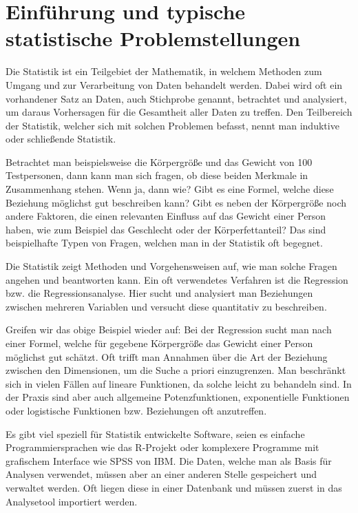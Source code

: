 \chapter{Einführung und typische statistische Problemstellungen}
\label{chapter:1}

Die Statistik ist ein Teilgebiet der Mathematik, in welchem Methoden zum Umgang und zur Verarbeitung von Daten behandelt werden. Dabei wird oft ein vorhandener Satz an Daten, auch Stichprobe genannt, betrachtet und analysiert, um daraus Vorhersagen für die Gesamtheit aller Daten zu treffen. Den Teilbereich der Statistik, welcher sich mit solchen Problemen befasst, nennt man induktive oder schließende Statistik.

Betrachtet man beispielsweise die Körpergröße und das Gewicht von 100 Testpersonen, dann kann man sich fragen, ob diese beiden Merkmale in Zusammenhang stehen. Wenn ja, dann wie? Gibt es eine Formel, welche diese Beziehung möglichst gut beschreiben kann? Gibt es neben der Körpergröße noch andere Faktoren, die einen relevanten Einfluss auf das Gewicht einer Person haben, wie zum Beispiel das Geschlecht oder der Körperfettanteil? Das sind beispielhafte Typen von Fragen, welchen man in der Statistik oft begegnet.

Die Statistik zeigt Methoden und Vorgehensweisen auf, wie man solche Fragen angehen und beantworten kann. Ein oft verwendetes Verfahren ist die Regression bzw. die Regressionsanalyse. Hier sucht und analysiert man Beziehungen zwischen mehreren Variablen und versucht diese quantitativ zu beschreiben.

Greifen wir das obige Beispiel wieder auf: Bei der Regression sucht man nach einer Formel, welche für gegebene Körpergröße das Gewicht einer Person möglichst gut schätzt. Oft trifft man Annahmen über die Art der Beziehung zwischen den Dimensionen, um die Suche a priori einzugrenzen. Man beschränkt sich in vielen Fällen auf lineare Funktionen, da solche leicht zu behandeln sind. In der Praxis sind aber auch allgemeine Potenzfunktionen, exponentielle Funktionen oder logistische Funktionen bzw. Beziehungen oft anzutreffen.

Es gibt viel speziell für Statistik entwickelte Software, seien es einfache Programmiersprachen wie das R-Projekt oder komplexere Programme mit grafischem Interface wie SPSS von IBM. Die Daten, welche man als Basis für Analysen verwendet, müssen aber an einer anderen Stelle gespeichert und verwaltet werden. Oft liegen diese in einer Datenbank und müssen zuerst in das Analysetool importiert werden.

